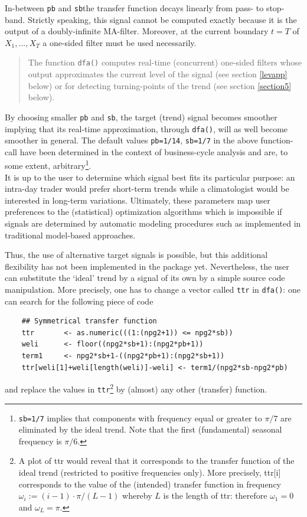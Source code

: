 \documentclass[a4paper]{article}
\begin{document}
In-between \texttt{pb} and \texttt{sb}the transfer function decays
linearly from pass- to stop-band. Strictly speaking, this signal
cannot be computed exactly because it is the output of a
doubly-infinite MA-filter.  Moreover, at the current boundary $t=T$ of
$X_1,...,X_T$ a one-sided
filter must be used necessarily. \\

\begin{quote}The function \texttt{dfa()} computes real-time
  (concurrent) one-sided filters whose output approximates the current
  level of the signal (see section \ref{levapp} below) or for
  detecting turning-points of the trend (see section \ref{section5}
  below).\end{quote}


\noindent By choosing smaller \texttt{pb} and \texttt{sb}, the target
(trend) signal becomes smoother implying that its real-time
approximation, through \texttt{dfa()}, will as well become smoother in
general. The default values \texttt{pb=1/14}, \texttt{sb=1/7} in the
above function-call have been determined in the context of
business-cycle analysis and are, to some extent,
arbitrary\footnote{\texttt{sb=1/7} implies that components with
  frequency equal or greater to $\pi/7$ are eliminated by the ideal
  trend. Note that the first (fundamental) seasonal frequency is
  $\pi/6$.}.\\

It is up to the user to determine which signal best fits its
particular purpose: an intra-day trader would prefer short-term trends
while a climatologist would be interested in long-term variations. 
Ultimately, these parameters map user preferences to the (statistical)
optimization algorithms which is impossible if signals are determined
by automatic modeling procedures such as implemented in traditional
model-based approaches. 

Thus, the use of alternative target signals is possible, but this
additional flexibility has not been implemented in the package yet. 
Nevertheless, the user can substitute the `ideal' trend by a signal of
its own by a simple source code manipulation. More precisely, one has
to change a vector called \texttt{ttr} in \texttt{dfa()}: one can
search for the following piece of code
\begin{verbatim}
    ## Symmetrical transfer function
    ttr       <- as.numeric(((1:(npg2+1)) <= npg2*sb))
    weli      <- floor((npg2*sb+1):(npg2*pb+1))
    term1     <- npg2*sb+1-((npg2*pb+1):(npg2*sb+1))
    ttr[weli[1]+weli[length(weli)]-weli] <- term1/(npg2*sb-npg2*pb)
\end{verbatim}
and replace the values in \texttt{ttr}\footnote{A plot of ttr would
  reveal that it corresponds to the transfer function of the ideal
  trend (restricted to positive frequencies only). More precisely,
  ttr[i] corresponds to the value of the (intended) transfer function
  in frequency $\omega_i:=(i-1) \cdot \pi/(L-1)$ whereby $L$ is the
  length of ttr: therefore $\omega_1=0$ and $\omega_L=\pi$.} by
(almost) any other (transfer) function. \\
\end{document}
